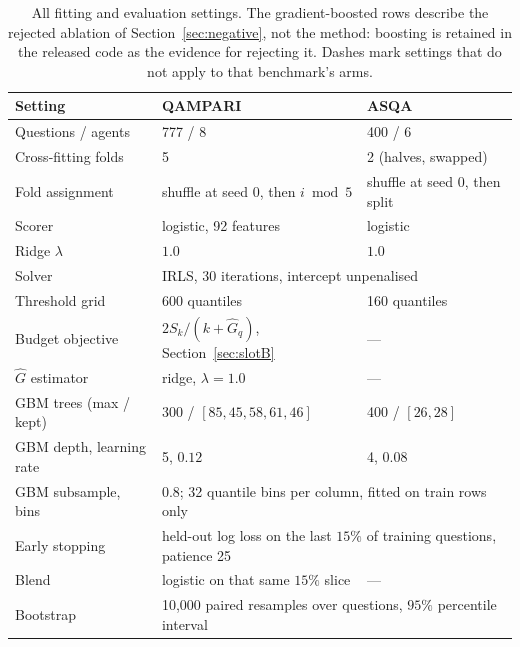 \documentclass{article}
\begin{document}
\begin{table}
  \caption{All fitting and evaluation settings. The gradient-boosted rows describe the rejected ablation of Section~\ref{sec:negative}, not the method: boosting is retained in the released code as the evidence for rejecting it. Dashes mark settings that do not apply to that benchmark's arms.}
  \label{tab:hyper}
  \centering
  \begin{tabular}{lll}
    \toprule
    Setting & QAMPARI & ASQA \\
    \midrule
    Questions / agents          & 777 / 8 & 400 / 6 \\
    Cross-fitting folds         & 5 & 2 (halves, swapped) \\
    Fold assignment             & shuffle at seed 0, then $i \bmod 5$ & shuffle at seed 0, then split \\
    \midrule
    Scorer                      & logistic, 92 features & logistic \\
    Ridge $\lambda$             & $1.0$ & $1.0$ \\
    Solver                      & \multicolumn{2}{l}{IRLS, 30 iterations, intercept unpenalised} \\
    Threshold grid              & 600 quantiles & 160 quantiles \\
    \midrule
    Budget objective            & $2S_k / (k + \hat{G}_q)$, Section~\ref{sec:slotB} & --- \\
    $\hat{G}$ estimator         & ridge, $\lambda = 1.0$ & --- \\
    \midrule
    GBM trees (max / kept)      & 300 / $[85, 45, 58, 61, 46]$ & 400 / $[26, 28]$ \\
    GBM depth, learning rate    & 5, $0.12$ & 4, $0.08$ \\
    GBM subsample, bins         & \multicolumn{2}{l}{$0.8$; 32 quantile bins per column, fitted on train rows only} \\
    Early stopping              & \multicolumn{2}{l}{held-out log loss on the last $15\%$ of training questions, patience 25} \\
    Blend                       & logistic on that same $15\%$ slice & --- \\
    \midrule
    Bootstrap                   & \multicolumn{2}{l}{10,000 paired resamples over questions, $95\%$ percentile interval} \\
    \bottomrule
  \end{tabular}
\end{table}
\end{document}
